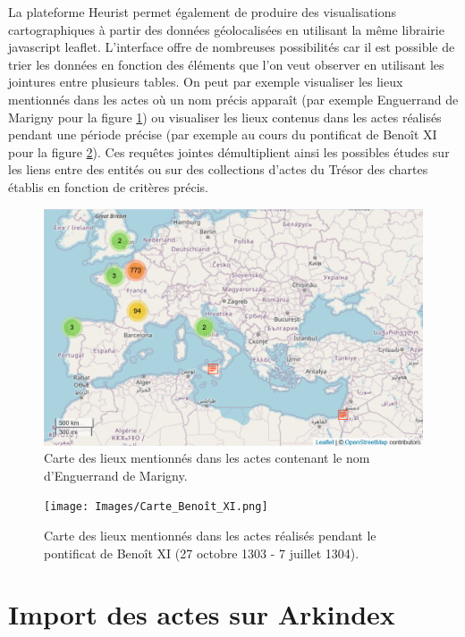 \documentclass[a4paper,12pt,twoside]{book}
\begin{document}
	La plateforme Heurist permet également de produire des visualisations cartographiques à partir des données géolocalisées en utilisant la même librairie javascript leaflet. L'interface offre de nombreuses possibilités car il est possible de trier les données en fonction des éléments que l'on veut observer en utilisant les jointures entre plusieurs tables. On peut par exemple visualiser les lieux mentionnés dans les actes où un nom précis apparaît (par exemple Enguerrand de Marigny pour la figure \ref{Carte_Enguerrand_Marigny}) ou visualiser les lieux contenus dans les actes réalisés pendant une période précise (par exemple au cours du pontificat de Benoît XI pour la figure \ref{Carte_Benoit_XI}). Ces requêtes jointes démultiplient ainsi les possibles études sur les liens entre des entités ou sur des collections d'actes du Trésor des chartes établis en fonction de critères précis.
	
	\begin{figure}
		\centering
		\includegraphics[width=\textwidth]{Images/Carte_Marigny.png}
		\caption{Carte des lieux mentionnés dans les actes contenant le nom d'Enguerrand de Marigny.}
		\label{Carte_Enguerrand_Marigny}
	\end{figure}

	\begin{figure}
		\centering
		\texttt{[image: Images/Carte\_Benoît\_XI.png]}
		\caption{Carte des lieux mentionnés dans les actes réalisés pendant le pontificat de Benoît XI (27 octobre 1303 - 7 juillet 1304).}
		\label{Carte_Benoit_XI}
	\end{figure}
	
	\section{Import des actes sur Arkindex}
	
\end{document}
